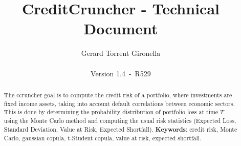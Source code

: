 \documentclass[a4paper,12pt,final]{article}
\def\numversion{1.4}
\def\svnversion{R529}
\begin{document}
\title{CreditCruncher - Technical Document}
\author{Gerard Torrent Gironella\\\\Version \numversion\ -\ \svnversion}
\date{}
\maketitle


\begin{abstract}
The ccruncher goal is to compute the credit risk of a portfolio, where 
investments are fixed income assets, taking into account default correlations
between economic sectors. This is done by determining the probability distribution 
of portfolio loss at time $T$ using the Monte Carlo method and computing the
usual risk statistics (Expected Loss, Standard Deviation, Value at Risk, Expected 
Shortfall).
\newline
\newline
\textbf{Keywords}: credit risk, Monte Carlo, gaussian copula, t-Student copula,
value at risk, expected shortfall.
\end{abstract}
\newpage


\tableofcontents
\newpage
\end{document}
